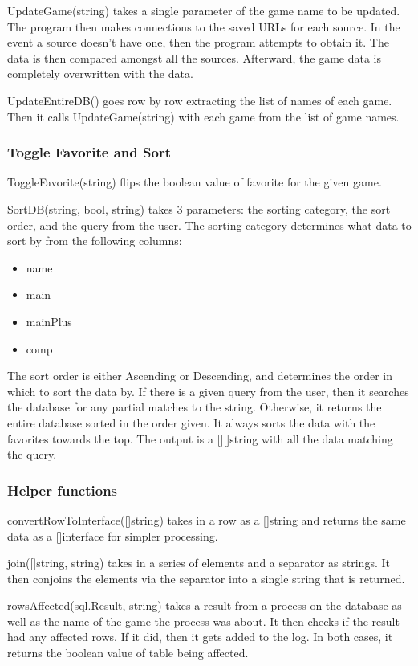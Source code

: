 UpdateGame(string) takes a single parameter of the game name to be updated.
The program then makes connections to the saved URLs for each source.
In the event a source doesn't have one, then the program attempts to obtain it.
The data is then compared amongst all the sources.
Afterward, the game data is completely overwritten with the data.

UpdateEntireDB() goes row by row extracting the list of names of each game.
Then it calls UpdateGame(string) with each game from the list of game names.

\subsubsection{Toggle Favorite and Sort}
\label{subsubsec:TogFavSort}

ToggleFavorite(string) flips the boolean value of favorite for the given game.

SortDB(string, bool, string) takes 3 parameters: the sorting
category, the sort order, and the query from the user.
The sorting category determines what data to sort by from the following columns:
\begin{itemize}
	\item name
	\item main
	\item mainPlus
	\item comp
\end{itemize}
The sort order is either Ascending or Descending, and determines the
order in which to sort the data by.
If there is a given query from the user, then it searches the
database for any partial matches to the string.
Otherwise, it returns the entire database sorted in the order given.
It always sorts the data with the favorites towards the top.
The output is a [][]string with all the data matching the query.

\subsubsection{Helper functions}

convertRowToInterface([]string) takes in a row as a []string and
returns the same data as a []interface{} for simpler processing.

join([]string, string) takes in a series of elements and a separator as strings.
It then conjoins the elements via the separator into a single string
that is returned.

rowsAffected(sql.Result, string) takes a result from a process on the
database as well as the name of the game the process was about.
It then checks if the result had any affected rows. If it did, then
it gets added to the log.
In both cases, it returns the boolean value of table being affected.

